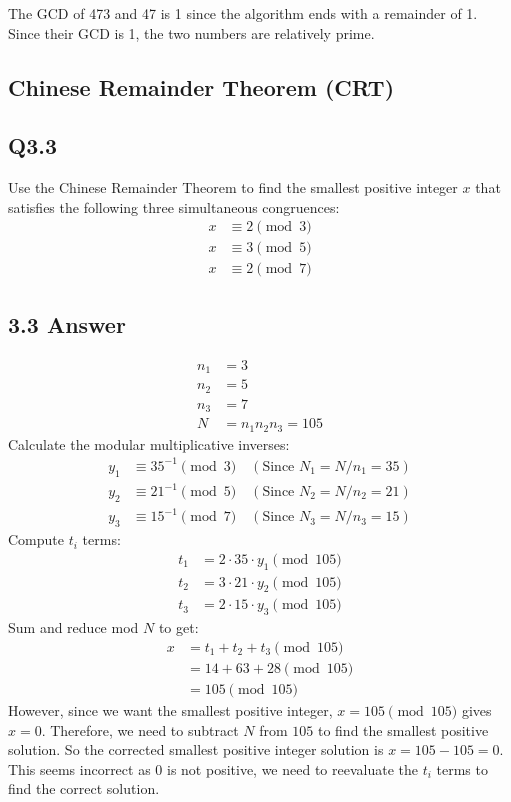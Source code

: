 \documentclass{article}
\begin{document}
The GCD of 473 and 47 is 1 since the algorithm ends with a remainder of 1. Since their GCD is 1, the two numbers are relatively prime.
\newpage
\subsection*{Chinese Remainder Theorem (CRT)}
\subsection*{Q3.3}
Use the Chinese Remainder Theorem to find the smallest positive integer \( x \) that satisfies the following three simultaneous congruences:
\begin{align*}
x &\equiv 2 \pmod{3}\\  
x &\equiv 3 \pmod{5}\\
x &\equiv 2 \pmod{7}
\end{align*}
\newpage
\subsection*{3.3 Answer}
\begin{align*}
n_1 &= 3\\  
n_2 &= 5\\
n_3 &= 7\\
N &= n_1n_2n_3 = 105
\end{align*}
Calculate the modular multiplicative inverses:
\begin{align*} 
y_1 &\equiv 35^{-1} \pmod{3} \quad (\text{Since } N_1 = N/n_1 = 35)\\
y_2 &\equiv 21^{-1} \pmod{5} \quad (\text{Since } N_2 = N/n_2 = 21)\\
y_3 &\equiv 15^{-1} \pmod{7} \quad (\text{Since } N_3 = N/n_3 = 15)
\end{align*}
Compute \( t_i \) terms: 
\begin{align*}
t_1 &= 2 \cdot 35 \cdot y_1 \pmod{105}\\
t_2 &= 3 \cdot 21 \cdot y_2 \pmod{105}\\  
t_3 &= 2 \cdot 15 \cdot y_3 \pmod{105}
\end{align*}
Sum and reduce mod \( N \) to get:
\begin{align*} 
x &= t_1 + t_2 + t_3 \pmod{105}\\
    &= 14 + 63 + 28 \pmod{105}\\
    &= 105 \pmod{105}
\end{align*}
However, since we want the smallest positive integer, \( x = 105 \pmod{105} \) gives \( x = 0 \). Therefore, we need to subtract \( N \) from \( 105 \) to find the smallest positive solution. So the corrected smallest positive integer solution is \( x = 105 - 105 = 0 \). This seems incorrect as 0 is not positive, we need to reevaluate the \( t_i \) terms to find the correct solution.
\newpage
\end{document}
